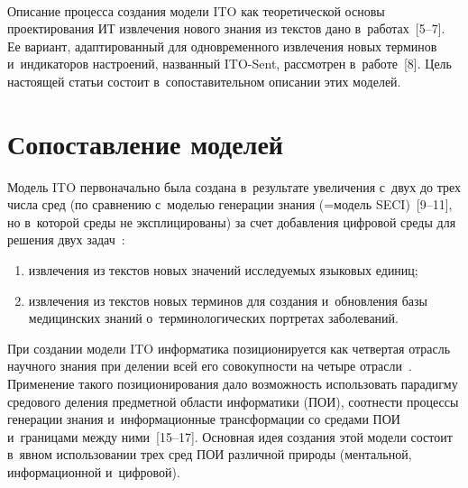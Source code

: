 \begin{multicols}{2}
\begin{figure*}[b] %
\vspace*{1pt}
  \begin{center}  
    \mbox{%
\epsfxsize=128mm
}
\end{center}
\vspace*{-9pt}
\end{figure*}
  
  Описание процесса создания модели ITO как тео\-ре\-ти\-че\-ской основы 
проектирования ИТ извлечения нового знания из 
текстов дано в~работах~[5--7]. Ее вариант, адаптированный для одновременного 
извлечения новых терминов и~индикаторов настроений, названный ITO-Sent, 
рас\-смот\-рен в~работе~[8]. Цель настоящей статьи со\-сто\-ит в~сопоставительном 
описании этих моделей.
  
\section{Сопоставление моделей}

  Модель ITO первоначально была создана в~результате увеличения с~двух до 
трех числа сред (по сравнению с~моделью генерации знания  
(=\;мо\-дель SECI)~[9--11], но в~которой среды не эксплицированы) за счет 
добавления циф\-ро\-вой среды для решения двух задач~\cite{5-zac, 6-zac, 12-zac}:
  \begin{enumerate}[(1)]
\item извлечения из текс\-тов новых значений ис\-сле\-ду\-емых языковых единиц;
\item извлечения из текс\-тов новых терминов для создания и~обновления базы 
медицинских знаний о~терминологических портретах заболеваний.
\end{enumerate}

  При создании модели ITO информатика позиционируется как четвертая отрасль 
научного знания при делении всей его совокупности на четыре  
отрасли~\cite{13-zac, 14-zac}. Применение такого позиционирования дало 
возможность использовать парадигму средового деления предметной об\-ласти 
информатики (ПОИ), соотнести процессы генерации знания и~информационные 
трансформации со средами ПОИ и~границами между ними~[15--17]. Основная 
идея создания этой модели со\-сто\-ит в~явном использовании трех сред ПОИ 
различной природы (ментальной, информационной и~циф\-ро\-вой).
  

\end{multicols}
